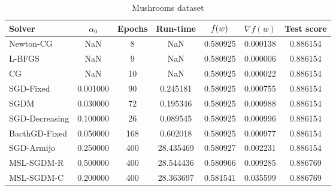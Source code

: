 \begin{table}
\caption{Mushrooms dataset}
\label{tab:mush-tab}
\centering
\begin{tabular}{lS[round-precision=3]S[drop-zero-decimal]S[round-precision=4]S[round-precision=6]S[exponent-mode=scientific]S[round-precision=6]}
\toprule
Solver & {$\alpha_0$} & {Epochs} & {Run-time} & {$\operatorname*{\mathit{f}}(w)$} & {$\nabla f(w)$} & {Test score} \\
\midrule
Newton-CG & NaN & 8 & NaN & 0.580925 & 0.000138 & 0.886154 \\
L-BFGS & NaN & 9 & NaN & 0.580925 & 0.000006 & 0.886154 \\
CG & NaN & 10 & NaN & 0.580925 & 0.000022 & 0.886154 \\
SGD-Fixed & 0.001000 & 90 & 0.245181 & 0.580925 & 0.000755 & 0.886154 \\
SGDM & 0.030000 & 72 & 0.195346 & 0.580925 & 0.000988 & 0.886154 \\
SGD-Decreasing & 0.100000 & 26 & 0.089545 & 0.580925 & 0.000996 & 0.886154 \\
BacthGD-Fixed & 0.050000 & 168 & 0.602018 & 0.580925 & 0.000977 & 0.886154 \\
SGD-Armijo & 0.250000 & 400 & 28.435469 & 0.580927 & 0.002231 & 0.886154 \\
MSL-SGDM-R & 0.500000 & 400 & 28.544436 & 0.580966 & 0.009285 & 0.886769 \\
MSL-SGDM-C & 0.200000 & 400 & 28.363697 & 0.581541 & 0.035599 & 0.886769 \\
\bottomrule
\end{tabular}
\end{table}

